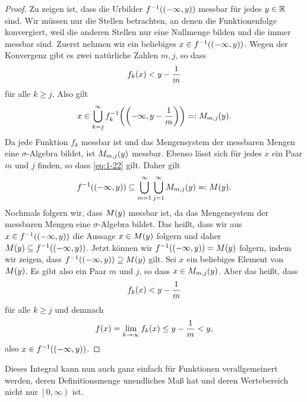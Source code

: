 \begin{proof}
	Zu zeigen ist, dass die Urbilder \(f^{-1}\parentheses*{\parentheses*{-\infty, y}}\) messbar für jedes \(y \in \mathbb{R}\) sind.
	Wir müssen nur die Stellen betrachten, an denen die Funktionenfolge konvergiert, weil die anderen Stellen nur eine Nullmenge bilden und die immer messbar sind.
	Zuerst nehmen wir ein beliebiges \(x \in f^{-1}\parentheses*{\parentheses*{-\infty, y}}\).
	Wegen der Konvergenz gibt es zwei natürliche Zahlen \(m, j\), so dass
	\[
		f_k\parentheses*{x} < y - \frac{1}{m}
	\]
	für alle \(k \ge j\).
	Also gilt
	\begin{equation}\label{eq:1-22}
		x \in \bigcup_{k = j}^\infty f_k^{-1}\parentheses*{\parentheses*{-\infty, y - \frac{1}{m}}} =: M_{m, j}\parentheses*{y}.
	\end{equation}
	Da jede Funktion \(f_k\) messbar ist und das Mengensystem der messbaren Mengen eine \(\sigma\)-Algebra bildet, ist \(M_{m, j}\parentheses*{y}\) messbar.
	Ebenso lässt sich für jedes \(x\) ein Paar \(m\) und \(j\) finden, so dass \eqref{eq:1-22} gilt.
	Daher gilt
	\[
		f^{-1}\parentheses*{\parentheses*{-\infty, y}} \subseteq \bigcup_{m = 1}^\infty \bigcup_{j = 1}^\infty M_{m, j}\parentheses*{y} =: M\parentheses*{y}.
	\]
	Nochmals folgern wir, dass \(M\parentheses*{y}\) messbar ist, da das Mengensystem der messbaren Mengen eine \(\sigma\)-Algebra bildet.
	Das heißt, dass wir aus \(x \in f^{-1}\parentheses*{\parentheses*{-\infty, y}}\) die Aussage \(x \in M\parentheses*{y}\) folgern und daher \(M\parentheses*{y} \subseteq f^{-1}\parentheses*{\parentheses*{-\infty, y}}\).
	Jetzt können wir \(f^{-1}\parentheses*{\parentheses*{-\infty, y}} = M\parentheses*{y}\) folgern, indem wir zeigen, dass \(f^{-1}\parentheses*{\parentheses*{-\infty, y}} \supseteq M\parentheses*{y}\) gilt.
	Sei \(x\) ein beliebiges Element von \(M\parentheses*{y}\).
	Es gibt also ein Paar \(m\) und \(j\), so dass \(x \in M_{m, j}\parentheses*{y}\).
	Aber das heißt, dass
	\[
		f_k\parentheses*{x} < y - \frac{1}{m}
	\]
	für alle \(k \ge j\) und demnach
	\[
		f\parentheses*{x} = \lim_{k \to \infty}f_k\parentheses*{x} \le y - \frac{1}{m} < y,
	\]
	also \(x \in f^{-1}\parentheses*{\parentheses*{-\infty, y}}\).
\end{proof}

Dieses Integral kann nun auch ganz einfach für Funktionen verallgemeinert werden, deren Definitionsmenge unendliches Maß hat und deren Wertebereich nicht nur \(\left[0, \infty\right)\) ist.

